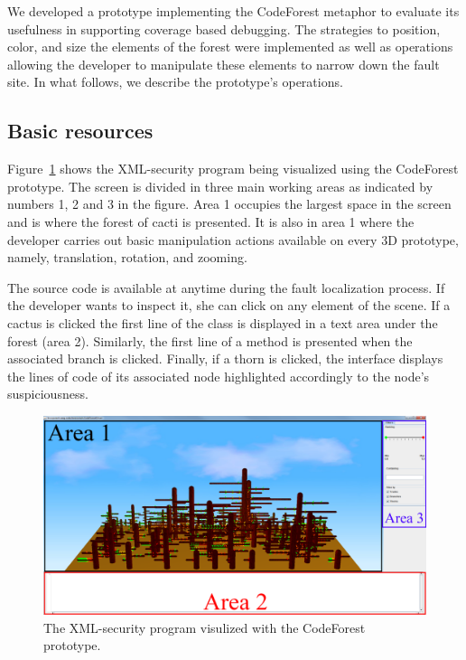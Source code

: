 \label{sec:prototype}
 
We developed a prototype implementing the CodeForest metaphor to evaluate its
usefulness in supporting coverage based debugging. The strategies to position,
color, and size the elements of the forest were implemented as well as
operations allowing the developer to manipulate these elements  to narrow down
the fault site. In what follows, we describe the prototype's operations.


\subsection{Basic resources}

Figure~\ref{fig:xml-security-codeforest} shows the XML-security program being
visualized using the CodeForest prototype.
The screen is divided in three main working areas as indicated by numbers 1, 2
and 3 in the figure. Area 1 occupies the largest space in the screen and is
where the forest of cacti is presented.  It is also in area 1 where the
developer carries out basic manipulation actions available on every 3D
prototype, namely, translation, rotation, and zooming.

The source code is available at anytime during the fault localization process.
If the developer wants to inspect it, she can click on any element of the scene.
If a cactus is clicked the first line of the class is displayed in a text area
under the forest (area 2). Similarly, the first line of a  method is presented
when the associated branch is clicked.
Finally, if a thorn  is clicked, the interface displays the lines of code of its
associated node highlighted accordingly to the node's suspiciousness.

\begin{figure}
  \centering
    \includegraphics[width=\linewidth]{figures/xml-security-codeforest.png}
  \caption{The XML-security program visulized with the CodeForest prototype.}
  \label{fig:xml-security-codeforest}
\end{figure}

